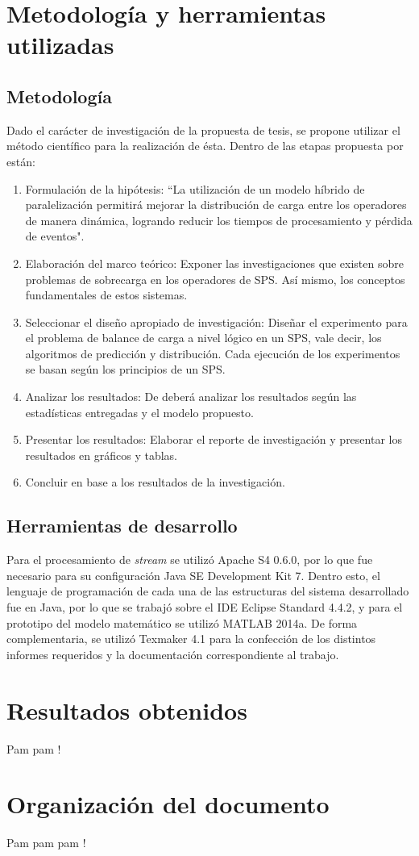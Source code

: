 \section{Metodología y herramientas utilizadas}
\label{intro:metodologia}

\subsection{Metodología}
Dado el carácter de investigación de la propuesta de tesis, se propone utilizar el método científico para la realización de ésta. Dentro de las etapas propuesta por \citep{hernandez2010metodologia} están:

\begin{enumerate}
	\item Formulación de la hipótesis: ``La utilización de un modelo híbrido de paralelización permitirá mejorar la distribución de carga entre los operadores de manera dinámica, logrando reducir los tiempos de procesamiento y pérdida de eventos".
	\item Elaboración del marco teórico: Exponer las investigaciones que existen sobre problemas de sobrecarga en los operadores de SPS. Así mismo, los conceptos fundamentales de estos sistemas.
	\item Seleccionar el diseño apropiado de investigación: Diseñar el experimento para el problema de balance de carga a nivel lógico en un SPS, vale decir, los algoritmos de predicción y distribución. Cada ejecución de los experimentos se basan según los principios de un SPS.
	\item Analizar los resultados: De deberá analizar los resultados según las estadísticas entregadas y el modelo propuesto.
	\item Presentar los resultados: Elaborar el reporte de investigación y presentar los resultados en gráficos y tablas.
	\item Concluir en base a los resultados de la investigación.
\end{enumerate}

\subsection{Herramientas de desarrollo}
Para el procesamiento de \textit{stream} se utilizó Apache S4 0.6.0, por lo que fue necesario para su configuración Java SE Development Kit 7. Dentro esto, el lenguaje de programación de cada una de las estructuras del sistema desarrollado fue en Java, por lo que se trabajó sobre el IDE Eclipse Standard 4.4.2, y para el prototipo del modelo matemático se utilizó MATLAB 2014a. De forma complementaria, se utilizó Texmaker 4.1 para la confección de los distintos informes requeridos y la documentación correspondiente al trabajo.

\section{Resultados obtenidos}
\label{intro:resultados}
Pam pam !

\section{Organización del documento}
\label{intro:organizacion}
Pam pam pam !

